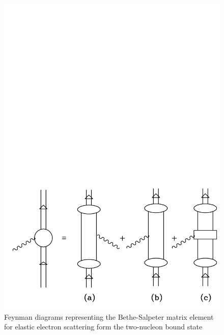 \documentclass[mythesis.tex]{subfiles}
\begin{document}
\begin{figure}
\centerline{\includegraphics[width=5in]{graphics/new/currntme.pdf}}
\caption{Feynman diagrams representing the Bethe-Salpeter matrix
element for elastic electron scattering form the two-nucleon bound
state} \label{BScurrent}
\end{figure}
\end{document}
